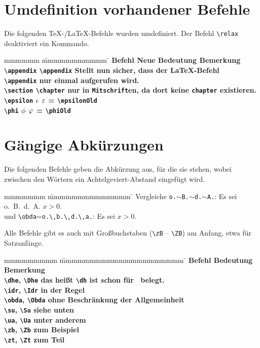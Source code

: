 		\section{Umdefinition vorhandener Befehle}
			Die folgenden \TeX-/\LaTeX-Befehle wurden umdefiniert. Der Befehl \verb|\relax| deaktiviert ein Kommando.
			\begin{tabbing}
				mmmmmm			\= mmmmmmmmmmm			\= \kill
				\bf Befehl 		\> \bf Neue Bedeutung	\> \bf Bemerkung																										\\
				\verb|\appendix|\> \verb|\appendix|		\> Stellt nun sicher, dass der \LaTeX-Befehl 																			\\
								\> 						\> \verb|\appendix| nur einmal aufgerufen wird.																			\\
				\verb|\section|	\> \verb|\chapter|		\> nur in \texttt{Mitschrift}en, da dort keine \texttt{chapter} existieren.												\\
				\verb|\epsilon|	\> $\epsilon$			\> $\epsilonOld$ = \verb|\epsilonOld|																					\\
				\verb|\phi|		\> $\phi$				\> $\phiOld$ = \verb|\phiOld|
			\end{tabbing}
		\section{Gängige Abkürzungen}
			Die folgenden Befehle geben die Abkürzung aus, für die sie stehen, wobei zwischen den Wörtern ein Achtelgeviert-Abstand eingefügt wird.
			\begin{tabbing}
				mmmmmmm			\= mmmmmmmmmmmmmm						\= \kill
				Vergleiche		\>\texttt{o.$\sim$B.$\sim$d.$\sim$A.}:	\> Es sei o.~B.~d.~A. $x>0$.\\
				und				\>\verb|\obda|=\verb|o.\,b.\,d.\,a.|:	\> Es sei \obda $x>0$.
			\end{tabbing}
			Alle Befehle gibt es auch mit Großbuchstaben (\verb|\zB| -- \verb|\ZB|) am Anfang, etwa für Satzanfänge.
			\begin{tabbing}
				mmmmmmmmm						\= mmmmmmmmmmmmmmmmmmmmm		\=\kill
				\bf Befehl						\> \bf Bedeutung 				\> \bf Bemerkung\\
				\verb|\dhe|, \verb|\Dhe|		\> das heißt 					\> \verb|\dh| ist schon für \dh\ belegt.	\\
				\verb|\idr|, \verb|\Idr|		\> in der Regel															\\
				\verb|\obda|, \verb|\Obda|		\> ohne Beschränkung der Allgemeinheit 									\\
				\verb|\su|, \verb|\Su|			\> siehe unten															\\
				\verb|\ua|, \verb|\Ua|			\> unter anderem														\\
				\verb|\zb|, \verb|\Zb|			\> zum Beispiel															\\
				\verb|\zt|,	\verb|\Zt|			\> zum Teil				
			\end{tabbing}
